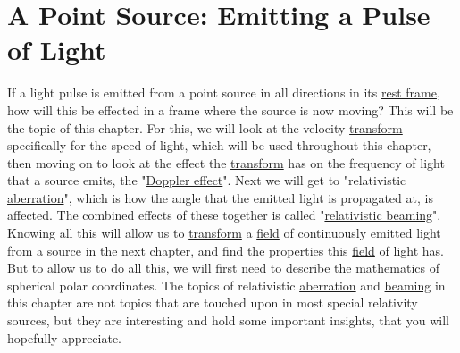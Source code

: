 \chapter{A Point Source: Emitting a Pulse of Light} \label{ch: A Point Source Emitting a Pulse of Light}




If a light pulse is emitted from a point source in all directions in its \hyperlink{def-proper-frame}{rest frame}, how will this be effected in a frame where the source is now moving?
This will be the topic of this chapter.
For this, we will look at the velocity \hyperlink{def-transform}{transform} specifically for the speed of light, which will be used throughout this chapter, then moving on to look at the effect the \hyperlink{def-transform}{transform} has on the frequency of light that a source emits, the "\hyperlink{def-doppler-effect}{Doppler effect}".
Next we will get to "relativistic \hyperlink{def-aberration}{aberration}", which is how the angle that the emitted light is propagated at, is affected.
The combined effects of these together is called "\hyperlink{def-relativistic-beaming}{relativistic beaming}".
Knowing all this will allow us to \hyperlink{def-transform}{transform} a \hyperlink{def-field}{field} of continuously emitted light from a source in the next chapter, and find the properties this \hyperlink{def-field}{field} of light has.
But to allow us to do all this, we will first need to describe the mathematics of spherical polar coordinates.
The topics of relativistic \hyperlink{def-aberration}{aberration} and \hyperlink{def-relativistic-beaming}{beaming} in this chapter are not topics that are touched upon in most special relativity sources, but they are interesting and hold some important insights, that you will hopefully appreciate.

